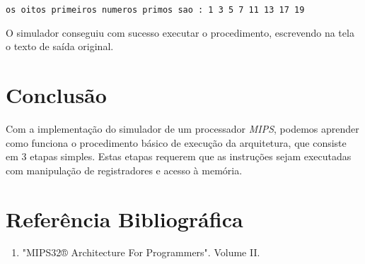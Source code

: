 \documentclass[12pt, a4paper, twoside]{article}
\begin{document}
\begin{lstlisting}
os oitos primeiros numeros primos sao : 1 3 5 7 11 13 17 19
\end{lstlisting}

O simulador conseguiu com sucesso executar o procedimento, escrevendo na tela
o texto de saída original.

\section{Conclusão}

Com a implementação do simulador de um processador \textit{MIPS}, podemos
aprender como funciona o procedimento básico de execução da arquitetura, que
consiste em 3 etapas simples. Estas etapas requerem que as instruções sejam
executadas com manipulação de registradores e acesso à memória.

\section{Referência Bibliográfica}

\begin{enumerate}
    \item "MIPS32® Architecture For Programmers". Volume II.
\end{enumerate}
\end{document}

